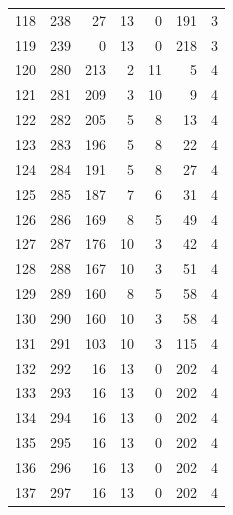 \documentclass[a4paper,twoside,12pt]{book}
\begin{document}
\begin{appendices}
\begin{table}
\begin{tabular}{lrrrrrr}
		118 &    238 &        27 &        13 &               0 &             191 &         3 \\
		119 &    239 &         0 &        13 &               0 &             218 &         3 \\
		120 &    280 &       213 &         2 &              11 &               5 &         4 \\
		121 &    281 &       209 &         3 &              10 &               9 &         4 \\
		122 &    282 &       205 &         5 &               8 &              13 &         4 \\
		123 &    283 &       196 &         5 &               8 &              22 &         4 \\
		124 &    284 &       191 &         5 &               8 &              27 &         4 \\
		125 &    285 &       187 &         7 &               6 &              31 &         4 \\
		126 &    286 &       169 &         8 &               5 &              49 &         4 \\
		127 &    287 &       176 &        10 &               3 &              42 &         4 \\
		128 &    288 &       167 &        10 &               3 &              51 &         4 \\
		129 &    289 &       160 &         8 &               5 &              58 &         4 \\
		130 &    290 &       160 &        10 &               3 &              58 &         4 \\
		131 &    291 &       103 &        10 &               3 &             115 &         4 \\
		132 &    292 &        16 &        13 &               0 &             202 &         4 \\
		133 &    293 &        16 &        13 &               0 &             202 &         4 \\
		134 &    294 &        16 &        13 &               0 &             202 &         4 \\
		135 &    295 &        16 &        13 &               0 &             202 &         4 \\
		136 &    296 &        16 &        13 &               0 &             202 &         4 \\
		137 &    297 &        16 &        13 &               0 &             202 &         4 \\

\end{tabular}
\end{table}
\end{appendices}
\end{document}
